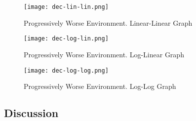 \begin{figure}[ht]
    \centering
    \texttt{[image: dec-lin-lin.png]}
    \caption{Progressively Worse Environment. Linear-Linear Graph}
    \label{fig:d1}
\end{figure}

\begin{figure}[ht]
    \centering
    \texttt{[image: dec-log-lin.png]}
    \caption{Progressively Worse Environment. Log-Linear Graph}
    \label{fig:d2}
\end{figure}

\begin{figure}[ht]
    \centering
    \texttt{[image: dec-log-log.png]}
    \caption{Progressively Worse Environment. Log-Log Graph}
    \label{fig:d3}
\end{figure}


\subsection{Discussion}

